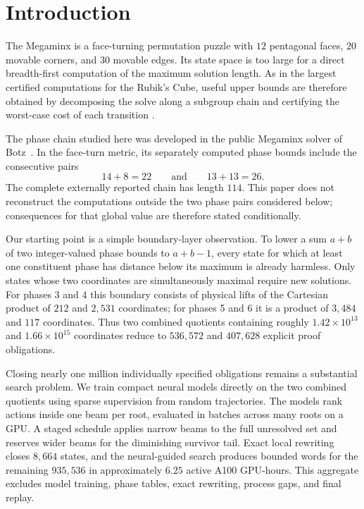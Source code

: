 \section{Introduction}
\label{sec:introduction}

The Megaminx is a face-turning permutation puzzle with $12$ pentagonal faces,
$20$ movable corners, and $30$ movable edges.  Its state space is too large for
a direct breadth-first computation of the maximum solution length.  As in the
largest certified computations for the Rubik's Cube, useful upper bounds are
therefore obtained by decomposing the solve along a subgroup chain and
certifying the worst-case cost of each transition
\cite{korf1997,kunkle2007,rokicki2013}.

The phase chain studied here was developed in the public Megaminx solver of
Botz~\cite{botz2026dataset}.  In the face-turn metric, its separately computed
phase bounds include the consecutive pairs
\[
  14+8=22
  \qquad\text{and}\qquad
  13+13=26.
\]
The complete externally reported chain has length $114$.  This paper does not
reconstruct the computations outside the two phase pairs considered below;
consequences for that global value are therefore stated conditionally.

Our starting point is a simple boundary-layer observation.  To lower a sum $a+b$
of two integer-valued phase bounds to $a+b-1$, every state for which at least
one constituent phase has distance below its maximum is already harmless.
Only states whose two coordinates are simultaneously maximal require new
solutions.  For phases 3 and 4 this boundary consists of physical lifts of the
Cartesian product
of $212$ and $2{,}531$ coordinates; for phases 5 and 6 it is a product of
$3{,}484$ and $117$ coordinates.  Thus two combined quotients containing
roughly $1.42\times10^{13}$ and $1.66\times10^{15}$ coordinates reduce to
$536{,}572$ and $407{,}628$ explicit proof obligations.

Closing nearly one million individually specified obligations remains a
substantial search problem.  We train compact neural models directly on the
two combined quotients using sparse supervision from random trajectories.
The models rank actions inside one beam per root, evaluated in batches across
many roots on a GPU.  A staged schedule applies narrow beams to the
full unresolved set and reserves wider beams for the diminishing survivor
tail.  Exact local rewriting closes $8{,}664$ states, and the neural-guided
search produces bounded words for the remaining $935{,}536$ in approximately
$6.25$ active A100 GPU-hours.  This aggregate excludes model training, phase
tables, exact rewriting, process gaps, and final replay.

